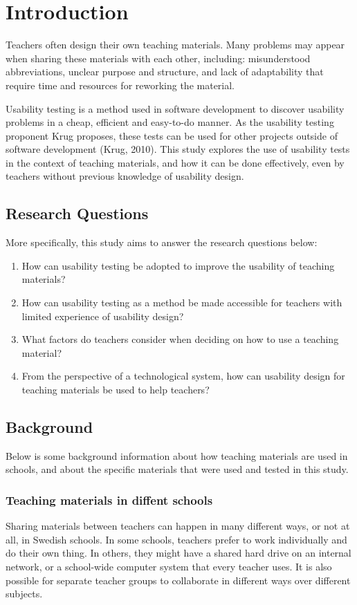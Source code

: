 \chapter{Introduction}

Teachers often design their own teaching materials. Many problems may appear when sharing these materials with each other, including: misunderstood abbreviations, unclear purpose and structure, and lack of adaptability that require time and resources for reworking the material.

Usability testing is a method used in software development to discover usability problems in a cheap, efficient and easy-to-do manner. As the usability testing proponent Krug proposes, these tests can be used for other projects outside of software development (Krug, 2010). This study explores the use of usability tests in the context of teaching materials, and how it can be done effectively, even by teachers without previous knowledge of usability design.

\section{Research Questions}
More specifically, this study aims to answer the research questions below:

\begin{enumerate}
	\item How can usability testing be adopted to improve the usability of teaching materials?
	\item How can usability testing as a method be made accessible for teachers with limited experience of usability design?
	\item What factors do teachers consider when deciding on how to use a teaching material?
	\item From the perspective of a technological system, how can usability design for teaching materials be used to help teachers?
\end{enumerate}

\section{Background}
Below is some background information about how teaching materials are used in schools, and about the specific materials that were used and tested in this study.

\subsection{Teaching materials in diffent schools}
Sharing materials between teachers can happen in many different ways, or not at all, in Swedish schools. In some schools, teachers prefer to work individually and do their own thing. In others, they might have a shared hard drive on an internal network, or a school-wide computer system that every teacher uses. It is also possible for separate teacher groups to collaborate in different ways over different subjects.

